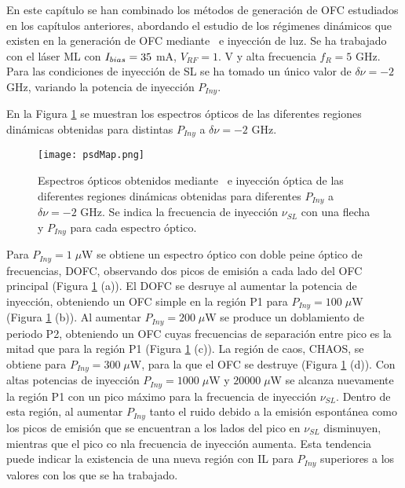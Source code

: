 \graphicspath{{../Graphics/Cpt3-CombInject/}}

En este cap\'itulo se han combinado los m\'etodos de generaci\'on de OFC estudiados en los cap\'itulos anteriores, abordando el estudio de los r\'egimenes din\'amicos que existen en la generaci\'on de OFC mediante \gs\ e inyecci\'on de luz. Se ha trabajado con el l\'aser ML con $I_{bias} = 35$ mA, $V_{RF} = 1.$ V y alta frecuencia $f_R = 5$ GHz. Para las condiciones de inyecci\'on de SL se ha tomado un \'unico valor de $\delta\nu = -2$ GHz, variando la potencia de inyecci\'on $P_{Iny}$.

En la Figura \ref{Img:MapGS-IO} se muestran los espectros \'opticos de las diferentes regiones din\'amicas obtenidas para distintas $P_{Iny}$ a $\delta\nu = -2$ GHz. 


			\begin{figure}[H]
				\centering
				\texttt{[image: psdMap.png]}
				\caption{\label{Img:MapGS-IO}Espectros \'opticos obtenidos mediante \gs\ e inyección \'optica de las diferentes regiones dinámicas obtenidas para diferentes $P_{Iny}$ a $\delta\nu = -2$ GHz. Se indica la frecuencia de inyección $\nu_{SL}$ con una flecha y $P_{Iny}$ para cada espectro \'optico.}
			\end{figure}

		Para $P_{Iny} = 1\;\mu$W se obtiene un espectro \'optico con doble peine \'optico de frecuencias, DOFC, observando dos picos de emisión a cada lado del OFC principal (Figura \ref{Img:MapGS-IO} (a)). El DOFC se desruye al aumentar la potencia de inyección, obteniendo un OFC simple en la regi\'on P1 para $P_{Iny} = 100\;\mu$W (Figura \ref{Img:MapGS-IO} (b)). Al aumentar $P_{Iny} = 200 \;\mu$W se produce un doblamiento de periodo P2, obteniendo un OFC cuyas frecuencias de separaci\'on entre pico es la mitad que para la regi\'on P1 (Figura \ref{Img:MapGS-IO} (c)). La región de caos, CHAOS, se obtiene para $P_{Iny} = 300\;\mu$W, para la que el OFC se destruye (Figura \ref{Img:MapGS-IO} (d)). Con altas potencias de inyecci\'on $P_{Iny} = 1000\;\mu$W y $ 20000\;\mu$W se alcanza nuevamente la regi\'on P1 con un pico m\'aximo para la frecuencia de inyecci\'on $\nu_{SL}$. Dentro de esta regi\'on, al aumentar $P_{Iny}$ tanto el ruido debido a la emisi\'on espont\'anea como los picos de emisi\'on que se encuentran a los lados del pico en $\nu_{SL}$ disminuyen, mientras que el pico co nla frecuencia de inyecci\'on aumenta. Esta tendencia puede indicar la existencia de una nueva regi\'on con IL para $P_{Iny}$ superiores a los valores con los que se ha trabajado.

